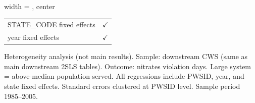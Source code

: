 \begin{table}[htbp]
\begin{adjustbox}{width = \textwidth, center}
\begin{tabular}{lc}
         STATE\_CODE fixed effects                     & $\checkmark$\\   
         year fixed effects                            & $\checkmark$\\   
         \bottomrule
      \end{tabular}
   \end{adjustbox}
   \par \raggedright 
   Heterogeneity analysis (not main results). Sample: downstream CWS (same as main downstream 2SLS tables). Outcome: nitrates violation days. Large system = above-median population served. All regressions include PWSID, year, and state fixed effects. Standard errors clustered at PWSID level. Sample period 1985--2005.
\end{table}


